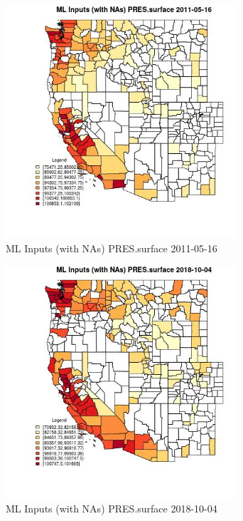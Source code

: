 \begin{figure} 
\centering  
\includegraphics[width=0.77\textwidth]{Code_Outputs/Report_ML_input_PM25_Step4_part_f_de_duplicated_aveswNAs_CountyPRESsurfaceMean2011-05-16.jpg} 
\caption{\label{fig:Report_ML_input_PM25_Step4_part_f_de_duplicated_aveswNAsCountyPRESsurfaceMean2011-05-16}ML Inputs (with NAs) PRES.surface 2011-05-16} 
\end{figure} 
 

\begin{figure} 
\centering  
\includegraphics[width=0.77\textwidth]{Code_Outputs/Report_ML_input_PM25_Step4_part_f_de_duplicated_aveswNAs_CountyPRESsurfaceMean2018-10-04.jpg} 
\caption{\label{fig:Report_ML_input_PM25_Step4_part_f_de_duplicated_aveswNAsCountyPRESsurfaceMean2018-10-04}ML Inputs (with NAs) PRES.surface 2018-10-04} 
\end{figure} 
 

